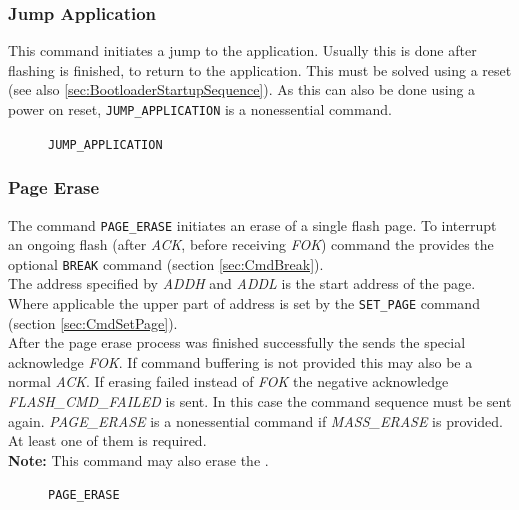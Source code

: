 \subsubsection{Jump Application}
\label{sec:JmpApplication}
This command initiates a jump to the application. Usually this is done after flashing is finished, to return to the application. This must be solved using a reset (see also \ref{sec:BootloaderStartupSequence}). As this can also be done using a power on reset, \texttt{JUMP_APPLICATION} is a nonessential command.

\begin{figure}[h]
\begin{center}
\caption{\texttt{JUMP_APPLICATION}}
\label{fig:CmdJumpApplication}
\end{center}
\end{figure}


\subsubsection{Page Erase}
\label{sec:PageErase}
The command \texttt{PAGE_ERASE} initiates an erase of a single flash page. To interrupt an ongoing flash (after \emph{ACK}, before receiving \emph{FOK}) command the \bl{} provides the optional \texttt{BREAK} command (section \ref{sec:CmdBreak}).\\
The address specified by \emph{ADDH} and \emph{ADDL} is the start address of the page. Where applicable the upper part of address is set by the \texttt{SET_PAGE} command (section \ref{sec:CmdSetPage}).\\
After the page erase process was finished successfully the \bl{} sends the special acknowledge \emph{FOK}. If command buffering is not provided this may also be a normal \emph{ACK}. If erasing failed instead of \emph{FOK} the negative acknowledge \emph{FLASH_CMD_FAILED} is sent. In this case the command sequence must be sent again.
\emph{PAGE_ERASE} is a nonessential command if \emph{MASS_ERASE} is provided. At least one of them is required.\\
\textbf{Note:} This command may also erase the \bro{}.\\ 
\begin{figure}[h]
\begin{center}
\caption{\texttt{PAGE_ERASE}}
\label{fig:CmdPageErase}
\end{center}
\end{figure}

